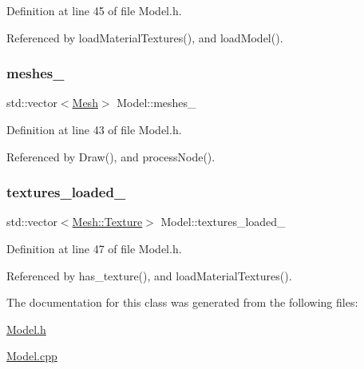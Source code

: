 Definition at line 45 of file Model.\+h.



Referenced by load\+Material\+Textures(), and load\+Model().

\mbox{\label{classModel_afdaef518b8ca4c7d9f95fda34f6b8ac9}} 
\subsubsection{\texorpdfstring{meshes\+\_\+}{meshes\_}}
{\footnotesize\ttfamily std\+::vector$<$\mbox{\hyperlink{classMesh}{Mesh}}$>$ Model\+::meshes\+\_\+\hspace{0.3cm}{\ttfamily [private]}}



Definition at line 43 of file Model.\+h.



Referenced by Draw(), and process\+Node().

\mbox{\label{classModel_a92d229e44cb31a539ec4b5c7db977059}} 
\subsubsection{\texorpdfstring{textures\+\_\+loaded\+\_\+}{textures\_loaded\_}}
{\footnotesize\ttfamily std\+::vector$<$\mbox{\hyperlink{structMesh_1_1Texture}{Mesh\+::\+Texture}}$>$ Model\+::textures\+\_\+loaded\+\_\+\hspace{0.3cm}{\ttfamily [private]}}



Definition at line 47 of file Model.\+h.



Referenced by has\+\_\+texture(), and load\+Material\+Textures().



The documentation for this class was generated from the following files\+:\begin{DoxyCompactItemize}
\item 
\mbox{\hyperlink{Model_8h}{Model.\+h}}\item 
\mbox{\hyperlink{Model_8cpp}{Model.\+cpp}}\end{DoxyCompactItemize}
